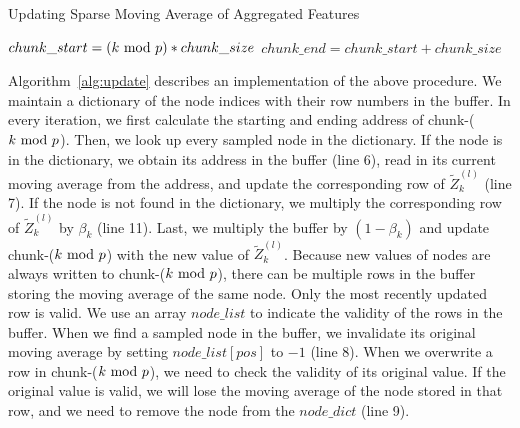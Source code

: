 \begin{algorithm}[t]
  \small
  \caption{Updating Sparse Moving Average of Aggregated Features}
  \label{alg:update}
  $chunk\_start=(k\ \mathrm{mod}\ p) * chunk\_size$\;
  $chunk\_end=chunk\_start + chunk\_size$\;
  \end{algorithm}

Algorithm~\ref{alg:update} describes an implementation of the above procedure. 
We maintain a dictionary of the node indices with their row numbers in the buffer. 
In every iteration, we first calculate the starting and ending address of chunk-($k\ \mathrm{mod}\ p$). 
Then, we look up every sampled node in the dictionary. 
If the node is in the dictionary, we obtain its address in the buffer (line 6), read in its current moving average from the address, and update the corresponding row of $\widetilde{Z}_k^{(l)}$ (line 7). 
If the node is not found in the dictionary, we multiply the corresponding row of $\widetilde{Z}_k^{(l)}$ by $\beta_k$ (line 11). 
Last, we multiply the buffer by $(1-\beta_k)$ and update chunk-($k\ \mathrm{mod}\ p$) with the new value of $\widetilde{Z}_k^{(l)}$.  
Because new values of nodes are always written to chunk-($k\ \mathrm{mod}\ p$), there can be multiple rows in the buffer storing the moving average of the same node. 
Only the most recently updated row is valid. 
We use an array $node\_list$ to indicate the validity of the rows in the buffer. 
When we find a sampled node in the buffer, we invalidate its original moving average by setting $node\_list[pos]$ to $-1$ (line 8). 
When we overwrite a row in chunk-($k\ \mathrm{mod}\ p$), we need to check the validity of its original value. 
If the original value is valid, we will lose the moving average of the node stored in that row, and we need to remove the node from the $node\_dict$ (line 9). 

